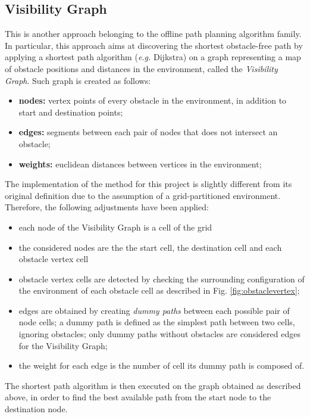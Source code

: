\documentclass[conference]{IEEEtran}
\begin{document}
\subsection{Visibility Graph}
This is another approach belonging to the offline path planning algorithm family. In particular, this approach aims at discovering the shortest obstacle-free path by applying a shortest path algorithm (\emph{e.g.} Dijkstra) on a graph representing a map of obstacle positions and distances in the environment, called the \emph{Visibility Graph}.
Such graph is created as follows:
\begin{itemize}
	\item \textbf{nodes:} vertex points of every obstacle in the environment, in addition to start and destination points;
	\item \textbf{edges:} segments between each pair of nodes that does not intersect an obstacle;
	\item \textbf{weights:} euclidean distances between vertices in the environment;
\end{itemize}

The implementation of the method for this project is slightly different from its original definition due to the assumption of a grid-partitioned environment. Therefore, the following adjustments have been applied:
\begin{itemize}
	\item each node of the Visibility Graph is a cell of the grid
	\item the considered nodes are the the start cell, the destination cell and each obstacle vertex cell
	\item obstacle vertex cells are detected by checking the surrounding configuration of the environment of each obstacle cell as described in Fig. \ref{fig:obstaclevertex};
	\item edges are obtained by creating \emph{dummy paths} between each possible pair of node cells; a dummy path is defined as the simplest path between two cells, ignoring obstacles; only dummy paths without obstacles are considered edges for the Visibility Graph;
	\item the weight for each edge is the number of cell its dummy path is composed of.
\end{itemize}

The shortest path algorithm is then executed on the graph obtained as described above, in order to find the best available path from the start node to the destination node.
\end{document}
